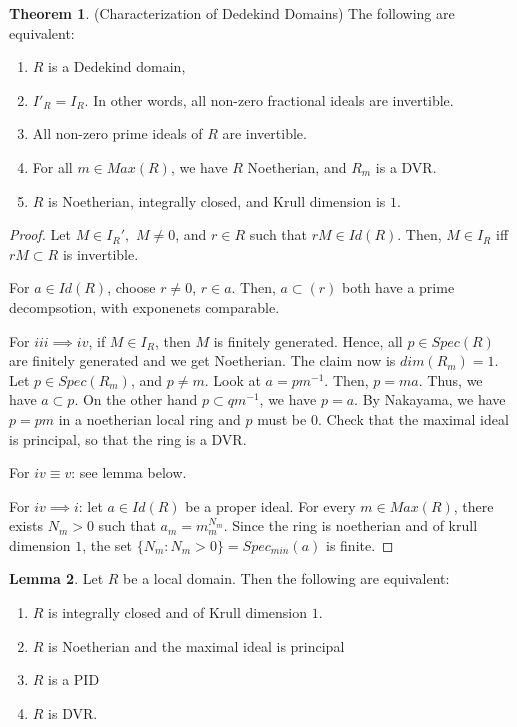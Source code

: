 \documentclass{article}
\theoremstyle{definition}
\newtheorem{theorem}{Theorem}[section]
\theoremstyle{definition}
\theoremstyle{definition}
\theoremstyle{definition}
\newtheorem{lemma}[theorem]{Lemma}
\theoremstyle{definition}
\theoremstyle{definition}
\theoremstyle{definition}
\begin{document}
\begin{tcolorbox}[colback=red!5!white,colframe=red!30!white]
\begin{theorem}
(Characterization of Dedekind Domains) The following are equivalent:
\begin{enumerate}
    \item $R$ is a Dedekind domain,
    \item $I'_R=I_R$. In other words, all non-zero fractional ideals are invertible.
    \item All non-zero prime ideals of $R$ are invertible.
    \item For all $m\in Max(R)$, we have $R$ Noetherian, and $R_m$ is a DVR.
    \item $R$ is Noetherian, integrally closed, and Krull dimension is $1$.   
\end{enumerate}

\end{theorem}
\end{tcolorbox}
\begin{proof}
    Let $M\in I_R',$ $M\neq 0$, and $r\in R$ such that $rM\in Id(R)$. Then, $M\in I_R$ iff $rM\subset R$ is invertible. 

    For $a\in Id(R)$, choose $r\neq 0$, $r\in a$. Then, $a\subset (r)$ both have a prime decompsotion, with exponenets comparable. 

    For $iii\implies iv$, if $M\in I_R$, then $M$ is finitely generated. Hence, all $p\in Spec(R)$ are finitely generated and we get Noetherian. The claim now is $dim(R_m)=1$. Let $p\in Spec(R_m)$, and $p\neq m$. Look at $a=pm^{-1}$. Then, $p=ma$. Thus, we have $a\subset p$. On the other hand $p\subset qm^{-1}$, we have $p=a$. By Nakayama, we have $p=pm$ in a noetherian local ring and $p$ must be $0$. Check that the maximal ideal is principal, so that the ring is a DVR.

    For $iv\equiv v$: see lemma below.
    
    For $iv\implies i$: let $a\in Id(R)$ be a proper ideal. For every $m\in Max(R)$, there exists $N_m>0$ such that $a_m=m_m^{N_m}$. Since the ring is noetherian and of krull dimension $1$, the set $\{ N_m:N_m>0 \}=Spec_{min}(a)$ is finite.  
\end{proof}


\begin{tcolorbox}
\begin{lemma}
Let $R$ be a local domain. Then the following are equivalent:
\begin{enumerate}
    \item $R$ is integrally closed and of Krull dimension $1$.
    \item $R$ is Noetherian and the maximal ideal is principal
    \item $R$ is a PID
    \item $R$ is DVR.
\end{enumerate}
\end{lemma}
\end{tcolorbox}
\end{document}

